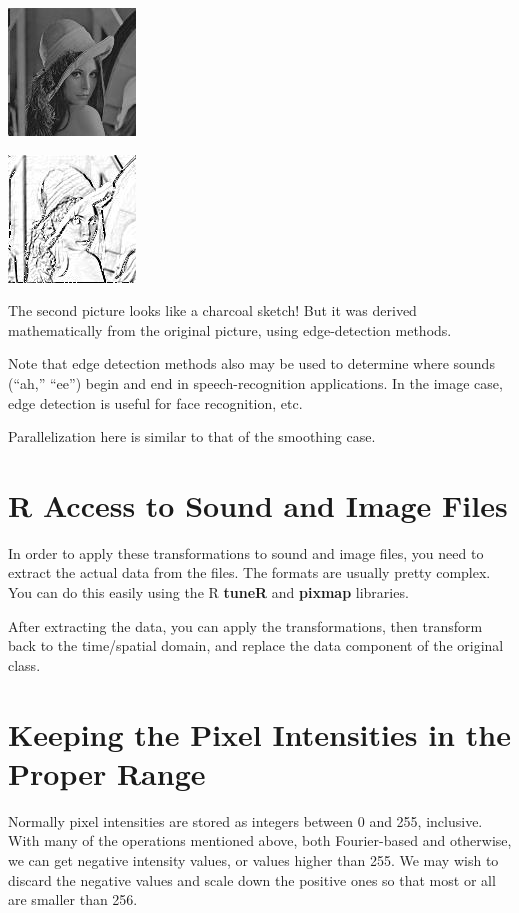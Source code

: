 \includegraphics{Images/LENAG.jpg}  

\includegraphics{Images/EDGESOB.jpg}  

The second picture looks like a charcoal sketch!  But it was derived
mathematically from the original picture, using edge-detection methods.

Note that edge detection methods also may be used to determine where
sounds (``ah,'' ``ee'') begin and end in speech-recognition applications.  
In the image case, edge detection is useful for face recognition, etc.

Parallelization here is similar to that of the smoothing case.

\section{R Access to Sound and Image Files}

In order to apply these transformations to sound and image files, you
need to extract the actual data from the files.  The formats are usually
pretty complex.  You can do this easily using the R {\bf tuneR} and {\bf
pixmap} libraries.

After extracting the data, you can apply the transformations, then
transform back to the time/spatial domain, and replace the data
component of the original class.

\section{Keeping the Pixel Intensities in the Proper Range}

Normally pixel intensities are stored as integers between 0 and 255,
inclusive.  With many of the operations mentioned above, both
Fourier-based and otherwise, we can get negative intensity values, or
values higher than 255.  We may wish to discard the negative values and
scale down the positive ones so that most or all are smaller than 256.

